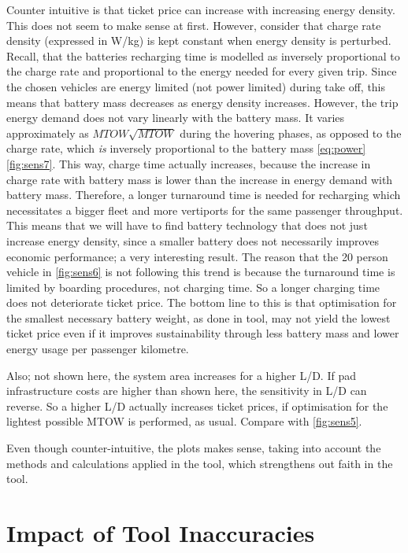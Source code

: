 Counter intuitive is that ticket price can increase with increasing energy density. This does not seem to make sense at first. However, consider that charge rate density (expressed in W/kg) is kept constant when energy density is perturbed. Recall, that the batteries recharging time is modelled as inversely proportional to the charge rate and proportional to the energy needed for every given trip. Since the chosen vehicles are energy limited (not power limited) during take off, this means that battery mass decreases as energy density increases. However, the trip energy demand does not vary linearly with the battery mass. It varies approximately as $MTOW\sqrt{MTOW}$ during the hovering phases, as opposed to the charge rate, which \emph{is} inversely proportional to the battery mass \autoref{eq:power}\autoref{fig:sens7}. This way, charge time actually increases, because the increase in charge rate with battery mass is lower than the increase in energy demand with battery mass. Therefore, a longer turnaround time is needed for recharging which necessitates a bigger fleet and more vertiports for the same passenger throughput. This means that we will have to find battery technology that does not just increase energy density, since a smaller battery does not necessarily improves economic performance; a very interesting result. The reason that the 20 person vehicle in \autoref{fig:sens6} is not following this trend is because the turnaround time is limited by boarding procedures, not charging time. So a longer charging time does not deteriorate ticket price. The bottom line to this is that optimisation for the smallest necessary battery weight, as done in tool, may not yield the lowest ticket price even if it improves sustainability through less battery mass and lower energy usage per passenger kilometre.

Also; not shown here, the system area increases for a higher L/D. If pad infrastructure costs are higher than shown here, the sensitivity in L/D can reverse. So a higher L/D actually increases ticket prices, if optimisation for the lightest possible MTOW is performed, as usual. Compare with \autoref{fig:sens5}.

Even though counter-intuitive, the plots makes sense, taking into account the methods and calculations applied in the tool, which strengthens out faith in the tool.




\section{Impact of Tool Inaccuracies} \label{sec:errorSensitivity}

